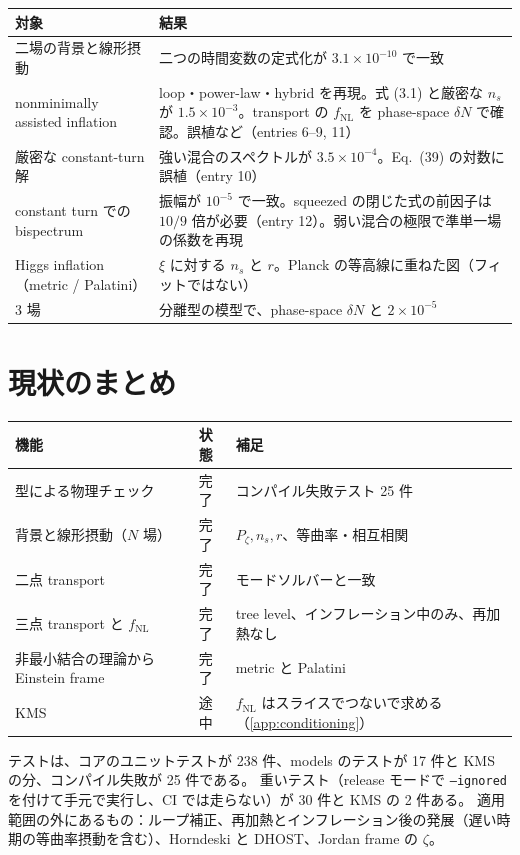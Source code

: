 \documentclass[a4paper,11pt]{ltjsarticle}
\newcommand{\fnl}{f_{\mathrm{NL}}}
\newcommand{\code}[1]{\texttt{#1}}
\begin{document}
\begin{center}
\small
\begin{tabular}{p{4.2cm}p{9.4cm}}
\toprule
対象 & 結果 \\
\midrule
二場の背景と線形摂動 & 二つの時間変数の定式化が $3.1\times10^{-10}$ で一致 \\
nonminimally assisted inflation\cite{HKKPT2023} & loop・power-law・hybrid を再現。式 (3.1) と厳密な $n_s$ が $1.5\times10^{-3}$。transport の $\fnl$ を phase-space $\delta N$ で確認。誤植など（entries 6--9, 11） \\
厳密な constant-turn 解\cite{HMPS2026} & 強い混合のスペクトルが $3.5\times10^{-4}$。Eq.~(39) の対数に誤植（entry 10） \\
constant turn での bispectrum\cite{HMPS2026b} & 振幅が $10^{-5}$ で一致。squeezed の閉じた式の前因子は $10/9$ 倍が必要（entry 12）。弱い混合の極限で準単一場\cite{ChenWang2010}の係数を再現 \\
Higgs inflation\cite{BezrukovShaposhnikov2008,BauerDemir2008}（metric / Palatini） & $\xi$ に対する $n_s$ と $r$。Planck\cite{Planck2018X} の等高線に重ねた図（フィットではない） \\
3 場 & 分離型の模型\cite{BattefeldEasther2007}で、phase-space $\delta N$ と $2\times10^{-5}$ \\
\bottomrule
\end{tabular}
\end{center}

\section{現状のまとめ}

\begin{center}
\small
\begin{tabular}{lll}
\toprule
機能 & 状態 & 補足 \\
\midrule
型による物理チェック & 完了 & コンパイル失敗テスト 25 件 \\
背景と線形摂動（$N$ 場） & 完了 & $P_\zeta, n_s, r$、等曲率・相互相関 \\
二点 transport & 完了 & モードソルバーと一致 \\
三点 transport と $\fnl$ & 完了 & tree level、インフレーション中のみ、再加熱なし \\
非最小結合の理論から Einstein frame & 完了 & metric と Palatini \\
KMS & 途中 & $\fnl$ はスライスでつないで求める（\ref{app:conditioning}） \\
\bottomrule
\end{tabular}
\end{center}
テストは、コアのユニットテストが 238 件、models のテストが 17 件と KMS の分、コンパイル失敗が 25 件である。
重いテスト（release モードで \code{--ignored} を付けて手元で実行し、CI では走らない）が 30 件と KMS の 2 件ある。
適用範囲の外にあるもの：ループ補正、再加熱とインフレーション後の発展（遅い時期の等曲率摂動\cite{SSK2014}を含む）、Horndeski と DHOST\cite{ZGB2014,LangloisNoui2016,BLN2016}、Jordan frame の $\zeta$\cite{WMS2012}。
\appendix
\end{document}
